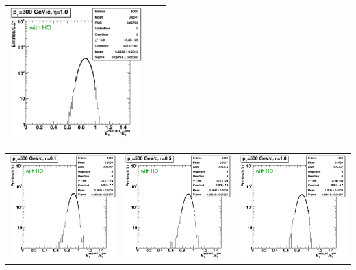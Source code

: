 \documentclass{cmspaper}
\begin{document}
\begin{appendices}
\begin{center}
\begin{tabular}{lll}
 \includegraphics[width=2in]{figs/h_ETRatioWithHO_ET_py_fit_corr_eta1.0_pT300.eps} \\
\end{tabular}
\end{center}
\begin{center}
\begin{tabular}{lll}
 \includegraphics[width=2in]{figs/h_ETRatioWithHO_ET_py_fit_corr_eta0.1_pT500.eps} &
 \includegraphics[width=2in]{figs/h_ETRatioWithHO_ET_py_fit_corr_eta0.5_pT500.eps} &
 \includegraphics[width=2in]{figs/h_ETRatioWithHO_ET_py_fit_corr_eta1.0_pT500.eps} \\

\end{tabular}
\end{center}
\end{appendices}
\end{document}
